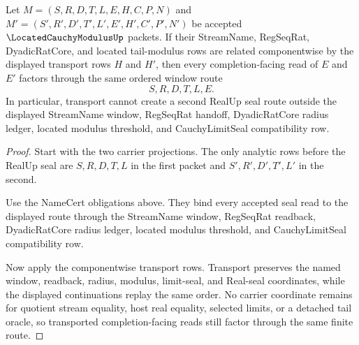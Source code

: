 \begin{theorem}
\label{thm:located-cauchy-modulus-window-stability}
Let $M=(S,R,D,T,L,E,H,C,P,N)$ and $M'=(S',R',D',T',L',E',H',C',P',N')$ be accepted $\LocatedCauchyModulusUp$ packets. If their StreamName, RegSeqRat, DyadicRatCore, and located tail-modulus rows are related componentwise by the displayed transport rows $H$ and $H'$, then every completion-facing read of $E$ and $E'$ factors through the same ordered window route
$$
S,R,D,T,L,E.
$$
In particular, transport cannot create a second RealUp seal route outside the displayed StreamName window, RegSeqRat handoff, DyadicRatCore radius ledger, located modulus threshold, and CauchyLimitSeal compatibility row.
\end{theorem}
\begin{proof}
Start with the two carrier projections. The only analytic rows before the RealUp seal are $S,R,D,T,L$ in the first packet and $S',R',D',T',L'$ in the second.

Use the NameCert obligations above. They bind every accepted seal read to the displayed route through the StreamName window, RegSeqRat readback, DyadicRatCore radius ledger, located modulus threshold, and CauchyLimitSeal compatibility row.

Now apply the componentwise transport rows. Transport preserves the named window, readback, radius, modulus, limit-seal, and Real-seal coordinates, while the displayed continuations replay the same order. No carrier coordinate remains for quotient stream equality, host real equality, selected limits, or a detached tail oracle, so transported completion-facing reads still factor through the same finite route.
\end{proof}

